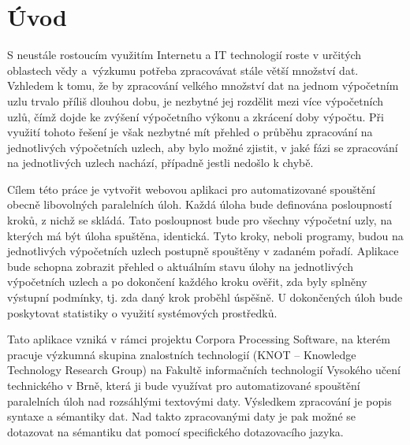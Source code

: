 

\newcommand{\tabitem}{~~\llap{\textbullet}~~}


\chapter{Úvod}


S neustále rostoucím využitím Internetu a IT technologií roste v určitých oblastech vědy a~výzkumu potřeba zpracovávat stále větší množství dat. Vzhledem k tomu, že by zpracování velkého množství dat na jednom výpočetním uzlu trvalo příliš dlouhou dobu, je nezbytné jej rozdělit mezi více výpočetních uzlů, čímž dojde ke zvýšení výpočetního výkonu a zkrácení doby výpočtu. Při využití tohoto řešení je však nezbytné mít přehled o průběhu zpracování na jednotlivých výpočetních uzlech, aby bylo možné zjistit, v jaké fázi se zpracování na jednotlivých uzlech nachází, případně jestli nedošlo k chybě.

Cílem této práce je vytvořit webovou aplikaci pro automatizované spouštění obecně libovolných paralelních úloh. Každá úloha bude definována posloupností kroků, z nichž se skládá. Tato posloupnost bude pro všechny výpočetní uzly, na kterých má být úloha spuštěna, identická. Tyto kroky, neboli programy, budou na jednotlivých výpočetních uzlech postupně spouštěny v zadaném pořadí. Aplikace bude schopna zobrazit přehled o aktuálním stavu úlohy na jednotlivých výpočetních uzlech a po dokončení každého kroku ověřit, zda byly splněny výstupní podmínky, tj. zda daný krok proběhl úspěšně. U dokončených úloh bude poskytovat statistiky o využití systémových prostředků.

Tato aplikace vzniká v rámci projektu Corpora Processing Software, na kterém pracuje výzkumná skupina znalostních technologií (KNOT – Knowledge Technology Research Group) na Fakultě informačních technologií Vysokého učení technického v Brně, která ji bude využívat pro automatizované spouštění paralelních úloh nad rozsáhlými textovými daty. Výsledkem zpracování je popis syntaxe a sémantiky dat. Nad takto zpracovanými daty je pak možné se dotazovat na sémantiku dat pomocí specifického dotazovacího jazyka.
 

